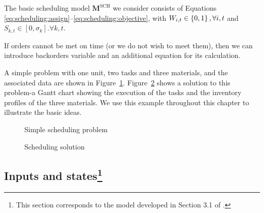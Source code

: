 The basic scheduling model $\mathbf{M}^{\text{SCH}}$ we consider
consists of Equations
\eqref{eq:scheduling:assign}--\eqref{eq:scheduling:objective}, with
$W_{i,t} \in \left\lbrace 0,1 \right\rbrace, \forall i,t$ and $S_{k,t} \in
[0,\sigma_k]. \forall k,t$.

If orders cannot be met on time (or we do not wish to meet them), then
we can introduce backorders variable and an additional equation for
its calculation. 

A simple problem
with one unit, two tasks and three materials, and the associated data
are shown in
Figure~\ref{fig:scheduling:ABexample}. Figure~\ref{fig:scheduling:ABgantt}
shows a solution to this problem-a Gantt chart showing the execution
of the tasks and the inventory profiles of the three materials. We use
this example throughout this chapter to illustrate the basic ideas.

\begin{figure}
  \centering
  \resizebox{0.5\columnwidth}{!}{}
  \caption{Simple scheduling problem}
  \label{fig:scheduling:ABexample}
\end{figure}

\begin{figure}[h]
  \centering
  \resizebox{0.5\columnwidth}{!}{}
  \caption{Scheduling solution}
  \label{fig:scheduling:ABgantt}
\end{figure}


\subsection{Inputs and states\footnote{This section corresponds to the model developed in Section 3.1 of
  \citet{subramanian:maravelias:rawlings:2012}.}}
 

